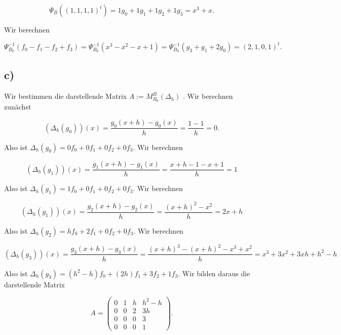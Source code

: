 \documentclass{article}
\begin{document}
\[
\Psi_B ((1,1,1,1)^t)
=
1 g_0 + 1 g_1 + 1 g_2 + 1 g_3
=
x^3 + x
.
\]

Wir berechnen

\[
\Psi_{B_0}^{-1}(f_0 - f_1 - f_2 + f_3)
=
\Psi_{B_0}^{-1}(x^3 - x^2 - x + 1)
=
\Psi_{B_0}^{-1}(g_3 + g_1 + 2 g_0)
=
(2,1,0,1)^t
.
\]

\newpage

\subsection*{c)}

Wir bestimmen die darstellende Matrix
$ A := M^B_{B_0}(\Delta_h) $
.
Wir berechnen zunächst

\[
\left( \Delta_h(g_0) \right)(x)
=
\frac{g_0(x + h) - g_0(x)}{h}
=
\frac{1 - 1}{h}
=
0.
\]

Also ist
$\Delta_h(g_0) = 0f_0 + 0f_1 + 0f_2 + 0f_3$.
Wir berechnen

\[
\left( \Delta_h(g_1) \right)(x)
=
\frac{g_1(x + h) - g_1(x)}{h}
=
\frac{x + h - 1 - x + 1}{h}
=
1
\]

Also ist 
$ \Delta_h(g_1) = 1f_0 + 0f_1 + 0f_2 + 0f_3 $.
Wir berechnen

\[
\left( \Delta_h(g_1) \right)(x)
=
\frac{g_2(x + h) - g_2(x)}{h}
=
\frac{(x + h)^2 - x^2}{h}
=
2x + h
\]

Also ist
$ \Delta_h(g_2) = hf_0 + 2f_1 + 0f_2 + 0f_3 $.
Wir berechnen

\[
\left( \Delta_h(g_3) \right)(x)
=
\frac{g_3(x + h) - g_3(x)}{h}
=
\frac{(x + h)^3 - (x + h)^2 - x^3 + x^2}{h}
=
x^3 + 3x^2 + 3xh + h^2 - h
\]

Also ist
$ \Delta_h(g_3) = (h^2 - h)f_0 +(2h)f_1 + 3f_2 + 1f_3 $.
Wir bilden daraus die darstellende Matrix

\[
A =
\begin{pmatrix}
 0 & 1 & h & h^2 - h \\
 0 & 0 & 2 & 3h \\
 0 & 0 & 0 & 3 \\
 0 & 0 & 0 & 1
\end{pmatrix}.
\]
\end{document}
